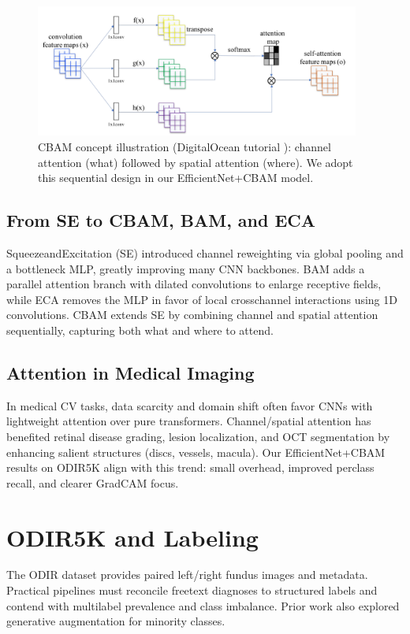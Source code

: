 \begin{figure}[t]
  \centering
  \includegraphics[width=0.95\textwidth]{../new_work/websites/Attention Mechanisms in Computer Vision_ CBAM _ DigitalOcean_files/main_model.png}
  \caption{CBAM concept illustration (DigitalOcean tutorial \cite{cbamDO}): channel attention (what) followed by spatial attention (where). We adopt this sequential design in our EfficientNet+CBAM model.}
  \label{fig:cbam_do_model}
\end{figure}

\subsection{From SE to CBAM, BAM, and ECA}
Squeeze\textendash and\textendash Excitation (SE) \cite{hu2018squeeze} introduced channel reweighting via global pooling and a bottleneck MLP, greatly improving many CNN backbones. BAM \cite{park2018bam} adds a parallel attention branch with dilated convolutions to enlarge receptive fields, while ECA \cite{wang2020eca} removes the MLP in favor of local cross\textendash channel interactions using 1D convolutions. CBAM \cite{woo2018cbam} extends SE by combining channel and spatial attention sequentially, capturing both what and where to attend.

\subsection{Attention in Medical Imaging}
In medical CV tasks, data scarcity and domain shift often favor CNNs with lightweight attention over pure transformers. Channel/spatial attention has benefited retinal disease grading, lesion localization, and OCT segmentation by enhancing salient structures (discs, vessels, macula). Our EfficientNet+CBAM results on ODIR\textendash 5K align with this trend: small overhead, improved per\textendash class recall, and clearer Grad\textendash CAM focus.

\section{ODIR\textendash 5K and Labeling}
The ODIR dataset provides paired left/right fundus images and metadata. Practical pipelines must reconcile free\textendash text diagnoses to structured labels and contend with multi\textendash label prevalence and class imbalance. Prior work also explored generative augmentation for minority classes.


